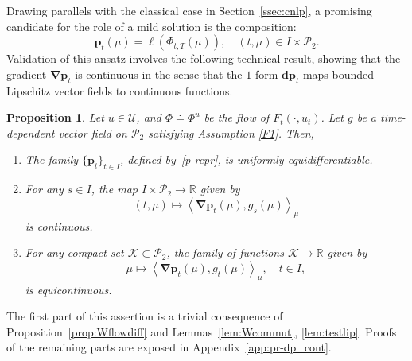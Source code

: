 \documentclass[sn-mathphys-num]{sn-jnl}
\numberwithin{equation}{section}
\theoremstyle{mythm}
\newtheorem{proposition}{Proposition}[section]
\theoremstyle{mydef}
\renewcommand{\mathbf}[1]{\bm{#1}}
\begin{document}
Drawing parallels with the classical case in Section~\ref{ssec:cnlp}, a promising candidate for the role of a mild solution is the composition:
\begin{equation}\label{p-repr}
  \bm p_t(\mu) = \ell(\Phi_{t,T}(\mu)), \quad (t, \mu) \in I \times \mathcal{P}_2.
\end{equation}
Validation of this ansatz involves the following technical result, showing that the gradient \( \bm \nabla \bm p_t \) is continuous in the sense that the \( 1 \)-form \( \mathbf{d}\bm p_t \) maps bounded Lipschitz vector fields to continuous functions.

\begin{proposition}
  \label{prop:dp_cont}
  Let \( u \in {\mathcal U}\), and \( \Phi \doteq \Phi^u \) be the flow of \( F_t(\cdot,u_t) \). 
Let \( g \) be a time-dependent vector field on \( \mathcal{P}_2 \) satisfying Assumption \ref{F1}.
Then, 
\begin{enumerate}[{\rm (1)}]
  \item The family $\{\mathbf{p}_t\}_{t \in I}$, defined by~\eqref{p-repr}, is uniformly equidifferentiable. 

  \item For any \( s\in I \), the map \( I \times \mathcal{P}_2 \to \mathbb{R} \) given by 
    \[
      (t,\mu) \mapsto \left< \bm \nabla \mathbf{p}_{t}(\mu), g_s(\mu) \right>_{\mu}
    \]
    is continuous.

  \item For any compact set  \( \mathcal{K} \subset \mathcal{P}_2 \), the family of functions \( \mathcal{K} \to \mathbb{R} \) given by
    \[
    \mu \mapsto \left< \bm \nabla \mathbf{p}_{t}(\mu), g_t(\mu) \right>_{\mu}, \quad t\in I,
    \]
    is equicontinuous.
\end{enumerate}
\end{proposition}
The first part of this assertion is a trivial consequence of Proposition~\ref{prop:Wflowdiff} and Lemmas~\ref{lem:Wcommut}, \ref{lem:testlip}. Proofs of the remaining parts are exposed in Appendix~\ref{app:pr-dp_cont}.
\end{document}
